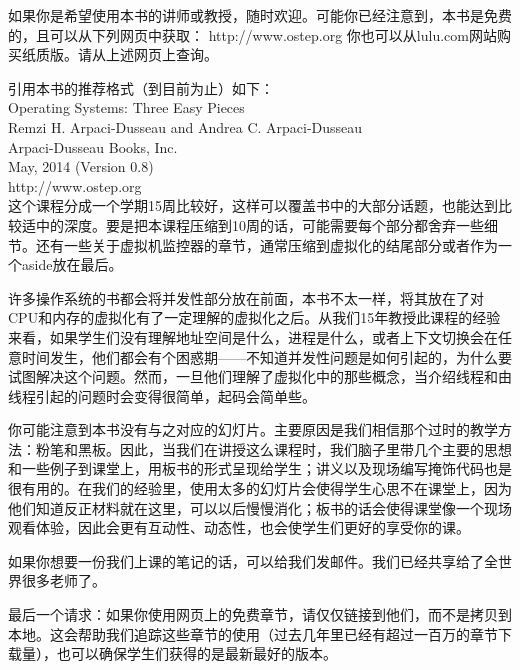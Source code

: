  \vspace*{0.0cm}
\thispagestyle{empty}
\centerline{}\vspace{2cm}

如果你是希望使用本书的讲师或教授，随时欢迎。可能你已经注意到，本书是免费的，且可以从下列网页中获取：
http://www.ostep.org
你也可以从lulu.com网站购买纸质版。请从上述网页上查询。

引用本书的推荐格式（到目前为止）如下：\\
Operating Systems: Three Easy Pieces\\
Remzi H. Arpaci-Dusseau and Andrea C. Arpaci-Dusseau\\
Arpaci-Dusseau Books, Inc.\\
May, 2014 (Version 0.8)\\
http://www.ostep.org\\

这个课程分成一个学期15周比较好，这样可以覆盖书中的大部分话题，也能达到比较适中的深度。要是把本课程压缩到10周的话，可能需要每个部分都舍弃一些细节。还有一些关于虚拟机监控器的章节，通常压缩到虚拟化的结尾部分或者作为一个aside放在最后。

许多操作系统的书都会将并发性部分放在前面，本书不太一样，将其放在了对CPU和内存的虚拟化有了一定理解的虚拟化之后。从我们15年教授此课程的经验来看，如果学生们没有理解地址空间是什么，进程是什么，或者上下文切换会在任意时间发生，他们都会有个困惑期——不知道并发性问题是如何引起的，为什么要试图解决这个问题。然而，一旦他们理解了虚拟化中的那些概念，当介绍线程和由线程引起的问题时会变得很简单，起码会简单些。

你可能注意到本书没有与之对应的幻灯片。主要原因是我们相信那个过时的教学方法：粉笔和黑板。因此，当我们在讲授这么课程时，我们脑子里带几个主要的思想和一些例子到课堂上，用板书的形式呈现给学生；讲义以及现场编写掩饰代码也是很有用的。在我们的经验里，使用太多的幻灯片会使得学生心思不在课堂上，因为他们知道反正材料就在这里，可以以后慢慢消化；板书的话会使得课堂像一个现场观看体验，因此会更有互动性、动态性，也会使学生们更好的享受你的课。

如果你想要一份我们上课的笔记的话，可以给我们发邮件。我们已经共享给了全世界很多老师了。

最后一个请求：如果你使用网页上的免费章节，请仅仅链接到他们，而不是拷贝到本地。这会帮助我们追踪这些章节的使用（过去几年里已经有超过一百万的章节下载量），也可以确保学生们获得的是最新最好的版本。
